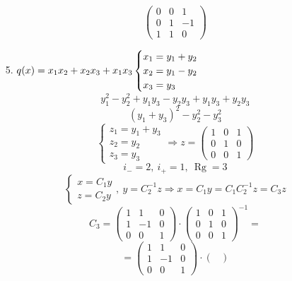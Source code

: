 \documentclass[12pt, letterpaper, twoside]{article}
\newcommand{\Rg}{\operatorname{Rg}}
\begin{document}
\begin{enumerate}
\[\begin{pmatrix}
                0 & 0 & 1\\
                0 & 1 & -1\\
                1 & 1 & 0
            \end{pmatrix}\]
            \item[5.] $q(x) = x_1  x_2 + x_2 x_3 + x_1 x_3\\
            \begin{cases}
                x_1 = y_1 + y_2\\
                x_2 = y_1 - y_2\\
                x_3 = y_3
            \end{cases}$
            \[y_1^2 - y_2^2 + y_1y_3 - y_2 y_3 + y_1y_3 + y_2 y_3\]
            \[(y_1 + y_3)^2 - y_2^2 - y_3^2\]
            \[\begin{cases}
                z_1 = y_1 + y_3\\
                z_2 = y_2\\
                z_3 = y_3
            \end{cases}\Rightarrow z = \begin{pmatrix}
                1 & 0 & 1\\
                0 & 1 & 0\\
                0 & 0 & 1
            \end{pmatrix}\]
            \[i_- = 2,\ i_+ = 1,\ \Rg = 3\]
            \[\begin{cases}
                x = C_1 y\\
                z = C_2 y
            \end{cases}
            ,\ y = C_2^{-1}z \Rightarrow x = C_1 y = C_1 C_2^{-1} z = C_3 z\]
            \[C_3 = \begin{pmatrix}
                1 & 1 & 0\\
                1 & -1 & 0\\
                0 & 0 & 1
            \end{pmatrix}\cdot \begin{pmatrix}
                1 & 0 & 1\\
                0 & 1 & 0\\
                0 & 0 & 1
            \end{pmatrix}^{-1} =\]
            \[ =\begin{pmatrix}
                1 & 1 & 0\\
                1 & -1 & 0\\
                0 & 0 & 1
            \end{pmatrix}\cdot \begin{pmatrix}

\end{pmatrix}\]
\end{enumerate}
\end{document}
